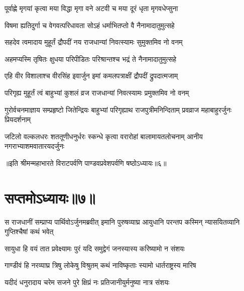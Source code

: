 


\twolineshloka
{पूर्वाह्णे मृगयां कृत्वा मया विद्धा मृगा वने}
{अटवी च मया दूरं धृता मृगवधेप्सुना}


\twolineshloka
{विषमा ह्यतिदुर्गा च वेगवत्परिधावता}
{सोऽहं धर्माभितप्तो वै नैनामादातुमुत्सहे}




\twolineshloka
{सहदेव त्वमादाय मुहूर्तं द्रौपदीं नय}
{राजधान्यां निवत्स्यामः सुमुक्तमिव नो वनम्}




\twolineshloka
{अहमप्यस्मि तृषितः क्षुधया परिपीडितः}
{परिश्रान्तश्च भद्रं ते नैनामादातुमुत्सहे}




\twolineshloka
{एहि वीर विशालाश्च वीरसिंह इवार्जुन}
{इमां कमलपत्राक्षीं द्रौपदीं द्रुपदात्मजाम्}


\twolineshloka
{परिगृह्य मुहूर्तं त्वं बाहुभ्यां कुशलं व्रज}
{राजधान्यां निवत्स्यामः प्रमुक्तमिव नो वनम्}



\threelineshloka
{गुरोर्वचनमाज्ञाय सम्प्रहृष्टो जितेन्द्रियः}
{बाहुभ्यां परिगृह्याथ राजपुत्रीमनिन्दिताम्}
{प्रवव्राज महाबाहुरर्जुनः प्रियदर्शनाम्}


\threelineshloka
{जटिलो वल्कलधरः शततूणीधनुर्धरः}
{स्कन्धे कृत्वा वरारोहां बालामायतलोचनाम्}
{आनीय नगराभ्याशमवातारयदर्जुनः}


॥इति श्रीमन्महाभारते विराटपर्वणि पाण्डवप्रवेशपर्वणि षष्ठोऽध्यायः॥६॥

\chapter{सप्तमोऽध्यायः॥७॥}

\threelineshloka
{स राजधानीं सम्प्राप्य पार्थिवोऽर्जुनमब्रवीत्}
{इमानि पुरुषव्याघ्र आयुधानि परन्तप}
{कस्मिन् न्यासयितव्यानि गुप्तिश्चैषां कथं भवेत्}


\twolineshloka
{सायुधा हि वयं तात प्रवेक्ष्यामः पुरं यदि}
{समुद्वेगं जनस्यास्य करिष्यामो न संशयः}


\twolineshloka
{गाण्डीवं हि नरव्याघ्र त्रिषु लोकेषु विश्रुतम्}
{कथं नाविष्कृताः स्यामो धार्तराष्ट्रस्य मारिष}


\twolineshloka
{यदीदं धनुरादाय चरेम सजने पुरे}
{क्षिप्रं नः प्रतिजानीयुर्मनुष्या नात्र संशयः}


